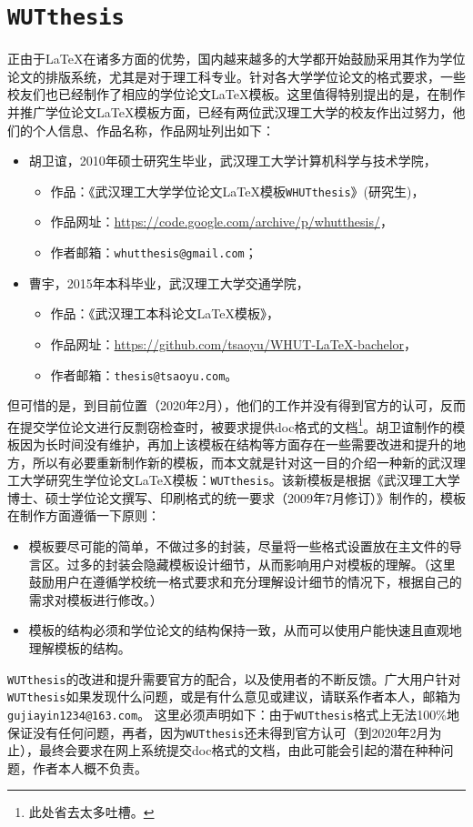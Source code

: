 \section{\texttt{WUTthesis}}



\par 正由于{\LaTeX}在诸多方面的优势，国内越来越多的大学都开始鼓励采用其作为学位论文的排版系统，尤其是对于理工科专业。针对各大学学位论文的格式要求，一些校友们也已经制作了相应的学位论文{\LaTeX}模板。这里值得特别提出的是，在制作并推广学位论文{\LaTeX}模板方面，已经有两位武汉理工大学的校友作出过努力，他们的个人信息、作品名称，作品网址列出如下：
\begin{itemize}
\item 胡卫谊，2010年硕士研究生毕业，武汉理工大学计算机科学与技术学院，
\begin{itemize}
\item 作品：《武汉理工大学学位论文{\LaTeX}模板\texttt{WHUTthesis}》(研究生)，
\item 作品网址：\url{https://code.google.com/archive/p/whutthesis/}，
\item 作者邮箱：\texttt{whutthesis@gmail.com}；
\end{itemize}
\item 曹宇，2015年本科毕业，武汉理工大学交通学院，
\begin{itemize}
\item 作品：《武汉理工本科论文{\LaTeX}模板》，
\item 作品网址：\url{https://github.com/tsaoyu/WHUT-LaTeX-bachelor}，
\item 作者邮箱：\texttt{thesis@tsaoyu.com}。
\end{itemize}
\end{itemize}
但可惜的是，到目前位置（2020年2月），他们的工作并没有得到官方的认可，反而在提交学位论文进行反剽窃检查时，被要求提供doc格式的文档\footnote{此处省去太多吐槽。}。胡卫谊制作的模板因为长时间没有维护，再加上该模板在结构等方面存在一些需要改进和提升的地方，所以有必要重新制作新的模板，而本文就是针对这一目的介绍一种新的武汉理工大学研究生学位论文{\LaTeX}模板：\texttt{WUTthesis}。该新模板是根据《武汉理工大学博士、硕士学位论文撰写、印刷格式的统一要求（2009年7月修订）》制作的，模板在制作方面遵循一下原则：
\begin{itemize}
\item 模板要尽可能的简单，不做过多的封装，尽量将一些格式设置放在主文件的导言区。过多的封装会隐藏模板设计细节，从而影响用户对模板的理解。（这里鼓励用户在遵循学校统一格式要求和充分理解设计细节的情况下，根据自己的需求对模板进行修改。）
\item 模板的结构必须和学位论文的结构保持一致，从而可以使用户能快速且直观地理解模板的结构。
\end{itemize}


\par \texttt{WUTthesis}的改进和提升需要官方的配合，以及使用者的不断反馈。广大用户针对\texttt{WUTthesis}如果发现什么问题，或是有什么意见或建议，请联系作者本人，邮箱为\texttt{gujiayin1234@163.com}。{\color{red} 这里必须声明如下：由于\texttt{WUTthesis}格式上无法100\%地保证没有任何问题，再者，因为\texttt{WUTthesis}还未得到官方认可（到2020年2月为止），最终会要求在网上系统提交doc格式的文档，由此可能会引起的潜在种种问题，作者本人概不负责。}


